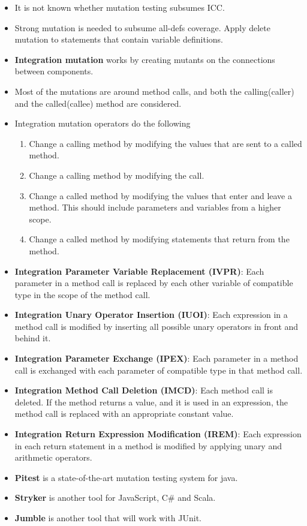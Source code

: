 \documentclass[a4paper]{article}
\begin{document}
\begin{itemize}
    \item It is not known whether mutation testing subsumes ICC.
    \item Strong mutation is needed to subsume all-defs coverage. Apply delete mutation to statements that contain variable definitions.
    \item \textbf{Integration mutation} works by creating mutants on the connections between components.
    \item Most of the mutations are around method calls, and both the calling(caller) and the called(callee) method are considered.
    \item Integration mutation operators do the following
    \begin{enumerate}
        \item Change a calling method by modifying the values that are sent to a called method.
        \item Change a calling method by modifying the call.
        \item Change a called method by modifying the values that enter and leave a method. This should include parameters and variables from a higher scope.
        \item Change a called method by modifying statements that return from the method.
    \end{enumerate}
    \item \textbf{Integration Parameter Variable Replacement (IVPR)}: Each parameter in a method call is replaced by each other variable of compatible type in the scope of the method call.
    \item \textbf{Integration Unary Operator Insertion (IUOI)}: Each expression in a method call is modified by inserting all possible unary operators in front and behind it.
    \item \textbf{Integration Parameter Exchange (IPEX)}: Each parameter in a method call is exchanged with each parameter of compatible type in that method call.
    \item \textbf{Integration Method Call Deletion (IMCD)}: Each method call is deleted. If the method returns a value, and it is used in an expression, the method call is replaced with an appropriate constant value.
    \item \textbf{Integration Return Expression Modification (IREM)}: Each expression in each return statement in a method is modified by applying unary and arithmetic operators.
    \item \textbf{Pitest} is a state-of-the-art mutation testing system for java.
    \item \textbf{Stryker} is another tool for JavaScript, C\# and Scala.
    \item \textbf{Jumble} is another tool that will work with JUnit.
\end{itemize}
\end{document}
